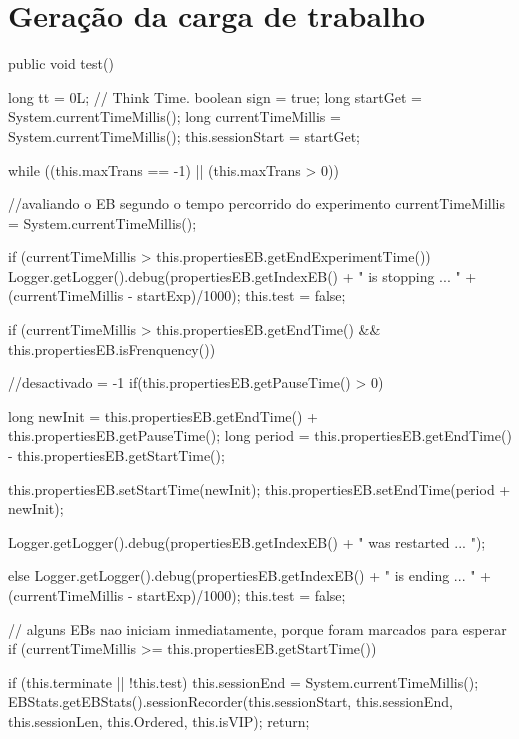 \section{Geração da carga de trabalho}

\begin{codigo}[caption={Algoritmo de geração de carga modificado para modulação}, label={code:modelworkload-all}, breaklines=true]
	public void test() {
		long tt = 0L; // Think Time.
		boolean sign = true;
		long startGet = System.currentTimeMillis();
		long currentTimeMillis = System.currentTimeMillis();
		this.sessionStart = startGet;
		
		
		while ((this.maxTrans == -1) || (this.maxTrans > 0)) {
			
			//avaliando o EB segundo o tempo percorrido do experimento
			currentTimeMillis = System.currentTimeMillis();
			
			if (currentTimeMillis > this.propertiesEB.getEndExperimentTime()){
				Logger.getLogger().debug(propertiesEB.getIndexEB() + " is stopping ... " + (currentTimeMillis - startExp)/1000);
				this.test = false;
			}
			
			if (currentTimeMillis > this.propertiesEB.getEndTime() && this.propertiesEB.isFrenquency()) {
				//desactivado = -1
				if(this.propertiesEB.getPauseTime() > 0){
					long newInit = this.propertiesEB.getEndTime() + this.propertiesEB.getPauseTime();
					long period = this.propertiesEB.getEndTime() - this.propertiesEB.getStartTime();
					
					this.propertiesEB.setStartTime(newInit);
					this.propertiesEB.setEndTime(period + newInit);
					
					Logger.getLogger().debug(propertiesEB.getIndexEB() + " was restarted  ... ");
				}else{
				Logger.getLogger().debug(propertiesEB.getIndexEB() + " is ending ... " + (currentTimeMillis - startExp)/1000);
				this.test = false;
			}
		}
		
		// alguns EBs nao iniciam inmediatamente, porque foram marcados para esperar
		if (currentTimeMillis >= this.propertiesEB.getStartTime()) {
			if (this.terminate || !this.test) {
				this.sessionEnd = System.currentTimeMillis();
				EBStats.getEBStats().sessionRecorder(this.sessionStart, this.sessionEnd, this.sessionLen,
				this.Ordered, this.isVIP);
				return;
			}
			
}}}
\end{codigo}
